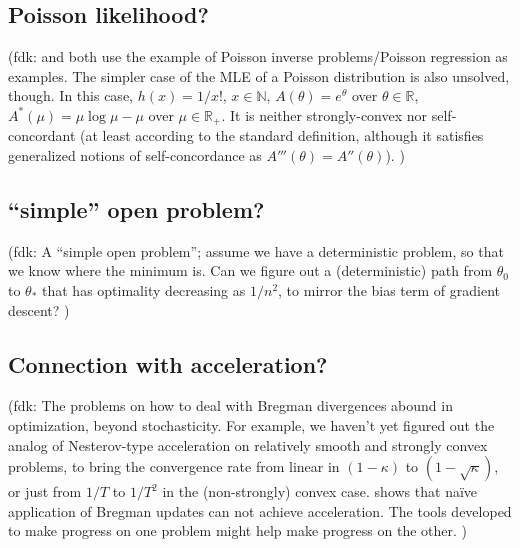 \documentclass[twoside]{article}
\newcommand{\fdk}[1]{\textcolor{Periwinkle}{(fdk:#1)}}
\newcommand{\m}{\mu}
\begin{document}
\subsection{Poisson likelihood?}
\fdk{
\citet{bauschke2017descent} and \citet{hanzely2018fastest} both use the example of Poisson inverse problems/Poisson regression
as examples.
The simpler case of the MLE of a Poisson distribution is also unsolved, though.
In this case, $h(x) = 1/x!$, $x \in \mathbb{N}$, $A(\theta) = e^\theta$ over $\theta \in \mathbb{R}$,
$A^*(\m) = \m \log \m - \m$ over $\m \in \mathbb{R}_+$.
It is neither strongly-convex nor self-concordant (at least according to the standard definition,
although it satisfies generalized notions of self-concordance as $A'''(\theta) = A''(\theta)$).
}

\subsection{``simple'' open problem?}
\fdk{
A ``simple open problem'';
assume we have a deterministic problem, so that we know where the minimum is.
Can we figure out a (deterministic) path from $\theta_0$ to $\theta_*$
that has optimality decreasing as $1/n^2$,
to mirror the bias term of gradient descent?
}

\subsection{Connection with acceleration?}
\fdk{
The problems on how to deal with Bregman divergences abound in optimization, beyond stochasticity.
For example, we haven't yet figured out the analog of Nesterov-type acceleration
on relatively smooth and strongly convex problems,
to bring the convergence rate from linear in $(1-\kappa)$ to $(1-\sqrt{\kappa})$,
or just from $1/T$ to $1/T^2$ in the (non-strongly) convex case.
\citet{dragomir2021optimal}  shows that naïve application of Bregman updates can not achieve acceleration.
The tools developed to make progress on one problem might help make progress on the other.
}










\newpage
\end{document}
